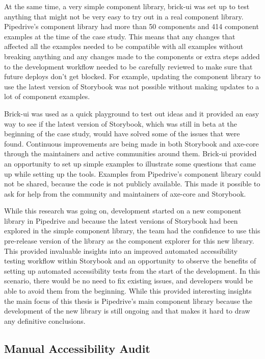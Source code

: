 \documentclass{master_thesis}
\begin{document}
At the same time, a very simple component library, brick-ui was set up to test anything that might not be very easy to try out in a real component library. Pipedrive's component library had more than 50 components and 414 component examples at the time of the case study. This means that any changes that affected all the examples needed to be compatible with all examples without breaking anything and any changes made to the components or extra steps added to the development workflow needed to be carefully reviewed to make sure that future deploys don't get blocked. For example, updating the component library to use the latest version of Storybook was not possible without making updates to a lot of component examples.

Brick-ui was used as a quick playground to test out ideas and it provided an easy way to see if the latest version of Storybook, which was still in beta at the beginning of the case study, would have solved some of the issues that were found. Continuous improvements are being made in both  Storybook and axe-core through the maintainers and active communities around them. Brick-ui provided an opportunity to set up simple examples to illustrate some questions that came up while setting up the tools. Examples from Pipedrive's component library could not be shared, because the code is not publicly available. This made it possible to ask for help from the community and maintainers of axe-core and Storybook.

While this research was going on, development started on a new component library in Pipedrive and because the latest versions of Storybook had been explored in the simple component library, the team had the confidence to use this pre-release version of the library as the component explorer for this new library. This provided invaluable insights into an improved automated accessibility testing workflow within Storybook and an opportunity to observe the benefits of setting up automated accessibility tests from the start of the development. In this scenario, there would be no need to fix existing issues, and developers would be able to avoid them from the beginning. While this provided interesting insights the main focus of this thesis is Pipedrive's main component library because the development of the new library is still ongoing and that makes it hard to draw any definitive conclusions.

\subsection{Manual Accessibility Audit}
\end{document}

